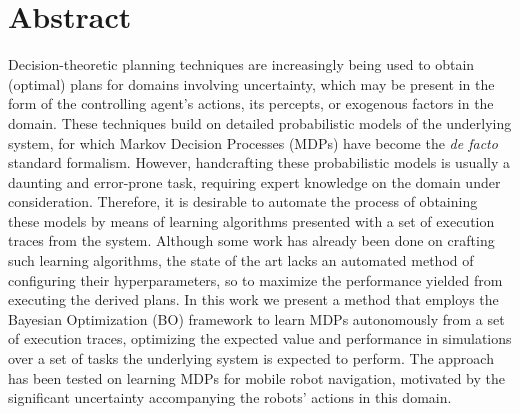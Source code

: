 \chapter*{Abstract}
\label{ch:abstract}

Decision-theoretic planning techniques are increasingly being used to obtain (optimal) plans for domains involving uncertainty, which may be present in the form of the controlling agent's actions, its percepts, or exogenous factors in the domain.
These techniques build on detailed probabilistic models of the underlying system, for which Markov Decision Processes (MDPs) have become the \textit{de facto} standard formalism.
However, handcrafting these probabilistic models is usually a daunting and error-prone task, requiring expert knowledge on the domain under consideration.
Therefore, it is desirable to automate the process of obtaining these models by means of learning algorithms presented with a set of execution traces from the system.
Although some work has already been done on crafting such learning algorithms, the state of the art lacks an automated method of configuring their hyperparameters, so to maximize the performance yielded from executing the derived plans.
In this work we present a method that employs the Bayesian Optimization (BO) framework to learn MDPs autonomously from a set of execution traces, optimizing the expected value and performance in simulations over a set of tasks the underlying system is expected to perform.
The approach has been tested on learning MDPs for mobile robot navigation, motivated by the significant uncertainty accompanying the robots' actions in this domain.


